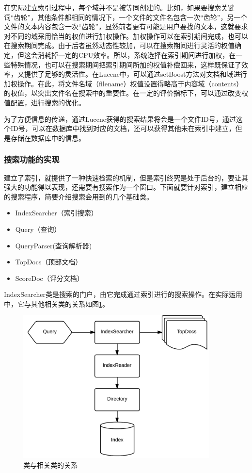 \documentclass[12pt,a4paper]{article}
\newcommand{\wuhao}{\fontsize{10.5pt}{\baselineskip}\selectfont}
\begin{document}
	在实际建立索引过程中，每个域并不是被等同创建的。比如，如果要搜索关键词“齿轮”，其他条件都相同的情况下，一个文件的文件名包含一次“齿轮”，另一个文件的文本内容包含一次“齿轮”，显然前者更有可能是用户要找的文本，这就要求对不同的域采用恰当的权值进行加权操作。加权操作可以在索引期间完成，也可以在搜索期间完成。由于后者虽然动态性较加，可以在搜索期间进行灵活的权值确定，但这会消耗掉一定的{\Times CPU}效率。所以，系统选择在索引期间进行加权，在一些特殊情况，也可以在搜索期间把索引期间所加的权值补偿回来，这样既保证了效率，又提供了足够的灵活性。在{\Times Lucene}中，可以通过{\Times setBoost}方法对文档和域进行加权操作。在此，将文件名域（{\Times filename}）权值设置得略高于内容域（{\Times contents}）的权值，以突出文件名在搜索中的重要性。在一定的评价指标下，可以通过改变权值配置，进行搜索的优化。

	为了方便信息的传递，通过{\Times Lucene}获得的搜索结果将会是一个文件{\Times ID}号，通过这个{\Times ID}号，可以在数据库中找到对应的文档，还可以获得其他未在索引中建立，但是存储在数据库中的信息。
	
		\subsubsection{搜索功能的实现}
	建立了索引，就提供了一种快速检索的机制，但是索引终究是处于后台的，要让其强大的功能得以表现，还需要有搜索作为一个窗口。下面就要针对索引，建立相应的搜索程序，简要介绍搜索会用到的几个基础类。
	
	\begin{itemize}
		\item {\Times IndexSearcher}（索引搜索）
		\item {\Times Query}（查询）
		\item {\Times QueryParser}(查询解析器)
		\item {\Times TopDocs}（顶部文档）
		\item {\Times ScoreDoc}（评分文档）
	\end{itemize}
	
	{\Times IndexSearcher}类是搜索的门户，由它完成通过索引进行的搜索操作。在实际运用中，它与其他相关类的关系如图\ref{fig:IndexSeacher类与相关类的关系}。
	
	\begin{figure}[htbp] 
	\centering\includegraphics[width=4in]{fig/IndexSearcher.png} 
	\caption{\wuhao {\Times IndexSeacher}类与相关类的关系}\label{fig:IndexSeacher类与相关类的关系} 
	\end{figure} 
	
\end{document}
